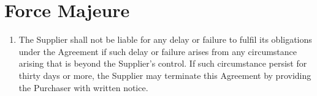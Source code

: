\documentclass[nz-terms]{subfiles}
\begin{document}
\section{Force Majeure}

\begin{enumerate}
\item The Supplier shall not be liable for any delay or failure to fulfil its
obligations under the Agreement if such delay or failure arises from any
circumstance arising that is beyond the Supplier's control. If such
circumstance persist for thirty days or more, the Supplier may terminate this
Agreement by providing the Purchaser with written notice.
\end{enumerate}
\end{document}
